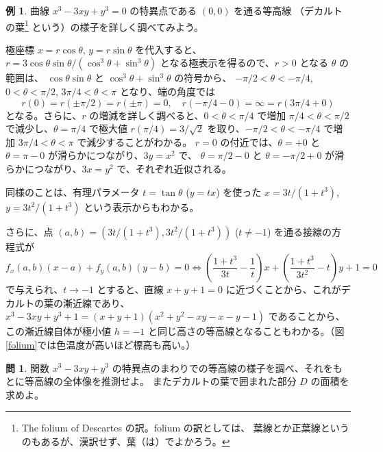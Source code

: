 \documentclass[a4paper]{jsarticle}
\theoremstyle{definition}
\newtheorem{Example}[Theorem]{例}
\newtheorem{Exercise}{問}%
\theoremstyle{remark}
\begin{document}
\begin{Example}
  曲線 $x^3 - 3xy + y^3 = 0$ の特異点である $(0,0)$ を通る等高線
  （デカルトの葉\footnote{The folium of Descartes の訳。folium の訳としては、
    葉線とか正葉線というのもあるが、漢訳せず、葉（は）でよかろう。} という）の様子を詳しく調べてみよう。

  極座標 $x = r\cos\theta$, $y = r\sin\theta$ を代入すると、
  $r = 3\cos\theta\sin\theta/(\cos^3\theta + \sin^3\theta)$ となる極表示を得るので、$r>0$ となる $\theta$ の範囲は、
  $\cos\theta\sin\theta$ と $\cos^3\theta + \sin^3\theta$ の符号から、
  $-\pi/2 < \theta < -\pi/4$, $0 < \theta < \pi/2$, $3\pi/4 < \theta < \pi$ となり、端の角度では
  \[
    r(0) = r(\pm \pi/2) = r(\pm \pi) = 0,
    \quad
    r(-\pi/4 -0) = \infty = r(3\pi/4 + 0)
  \]
  となる。さらに、$r$ の増減を詳しく調べると、$0 < \theta < \pi/4$ で増加 $\pi/4 < \theta < \pi/2$ で減少し、$\theta = \pi/4$
  で極大値 $r(\pi/4) = 3/\sqrt{2}$ を取り、$-\pi/2 < \theta < -\pi/4$ で増加 $3\pi/4 < \theta < \pi$ で減少することがわかる。
  $r=0$ の付近では、$\theta = +0$ と $\theta = \pi - 0$ が滑らかにつながり、$3y = x^2$ で、
  $\theta = \pi/2 -0$ と $\theta = -\pi/2 + 0$ が滑らかにつながり、$3x = y^2$ で、それぞれ近似される。

  同様のことは、有理パラメータ $t = \tan\theta$ ($y = tx$) を使った $x = 3t/(1+t^3)$, $y = 3t^2/(1+t^3)$ という表示からもわかる。

  さらに、点 $(a,b) = (3t/(1+t^3), 3t^2/(1+t^3))$ ($t \not= -1$) を通る接線の方程式が
  \[
    f_x(a,b) (x-a) + f_y(a,b)(y-b) = 0 \iff
      \left(\frac{1+t^3}{3t} - \frac{1}{t}\right)x + \left(\frac{1+t^3}{3t^2} - t\right)y + 1 = 0%
  \]
  で与えられ、$t \to -1$ とすると、直線 $x+y + 1 = 0$ に近づくことから、これがデカルトの葉の漸近線であり、
  $x^3-3xy + y^3+1 = (x+y+1)(x^2 + y^2 -xy - x - y -1)$ であることから、
  この漸近線自体が極小値 $h=-1$ と同じ高さの等高線となることもわかる。（図\ref{folium}では色温度が高いほど標高も高い。）
\end{Example}

\begin{Exercise}
  関数 $x^3 - 3xy + y^3$ の特異点のまわりでの等高線の様子を調べ、それをもとに等高線の全体像を推測せよ。
  またデカルトの葉で囲まれた部分 $D$ の面積を求めよ。
\end{Exercise}
\end{document}
